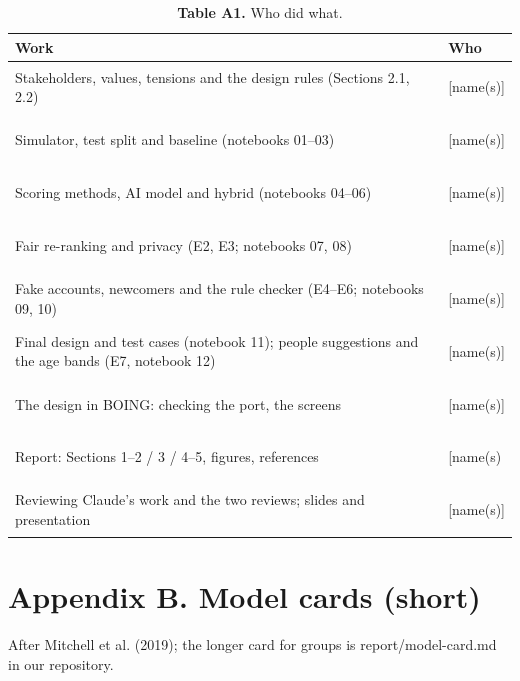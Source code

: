 \documentclass[11pt,letterpaper]{article}
\newcommand{\rowrule}{\midrule[0.2pt]}
\DeclareRobustCommand{\phword}[1]{{\setlength{\fboxsep}{0pt}\colorbox{phyellow}{\strut #1}}}
\DeclareRobustCommand{\phgap}{{\color{phyellow}\leaders\hrule height\ht\strutbox depth\dp\strutbox\hskip 0.3em plus 0.15em minus 0.08em}}
\begin{document}
\begin{table}[!htbp]
\centering
\caption*{\textbf{Table A1.} Who did what.}
\scriptsize
\begin{tabular}{
  >{\raggedright\arraybackslash}p{}
  >{\raggedright\arraybackslash}p{}
}
\toprule
\textbf{Work} & \textbf{Who} \\
\midrule
Stakeholders, values, tensions and the design rules (Sections 2.1, 2.2) & \phword{[name(s)]} \\
\rowrule
Simulator, test split and baseline (notebooks 01--03) & \phword{[name(s)]} \\
\rowrule
Scoring methods, AI model and hybrid (notebooks 04--06) & \phword{[name(s)]} \\
\rowrule
Fair re-ranking and privacy (E2, E3; notebooks 07, 08) & \phword{[name(s)]} \\
\rowrule
Fake accounts, newcomers and the rule checker (E4--E6; notebooks 09, 10) & \phword{[name(s)]} \\
\rowrule
Final design and test cases (notebook 11); people suggestions and the age bands (E7, notebook 12) & \phword{[name(s)]} \\
\rowrule
The design in BOING: checking the port, the screens & \phword{[name(s)]} \\
\rowrule
Report: Sections 1--2 / 3 / 4--5, figures, references & \phword{[name(s)}\phgap{}\phword{for}\phgap{}\phword{each]} \\
\rowrule
Reviewing Claude's work and the two reviews; slides and presentation & \phword{[name(s)]} \\
\bottomrule
\end{tabular}
\end{table}

\section{Appendix B. Model cards (short)}

After Mitchell et al. (2019); the longer card for groups is report/model-card.md in our repository.
\end{document}
